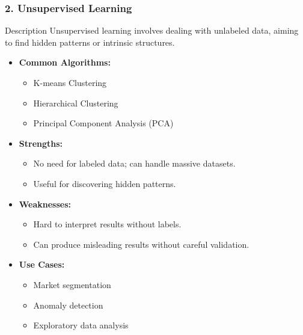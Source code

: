 \documentclass[aspectratio=169]{beamer}
\begin{document}
\begin{frame}[fragile]
    \frametitle{2. Unsupervised Learning}
    \begin{block}{Description}
        Unsupervised learning involves dealing with unlabeled data, aiming to find hidden patterns or intrinsic structures.
    \end{block}
    \begin{itemize}
        \item \textbf{Common Algorithms:}
            \begin{itemize}
                \item K-means Clustering
                \item Hierarchical Clustering
                \item Principal Component Analysis (PCA)
            \end{itemize}
        \item \textbf{Strengths:}
            \begin{itemize}
                \item No need for labeled data; can handle massive datasets.
                \item Useful for discovering hidden patterns.
            \end{itemize}
        \item \textbf{Weaknesses:}
            \begin{itemize}
                \item Hard to interpret results without labels.
                \item Can produce misleading results without careful validation.
            \end{itemize}
        \item \textbf{Use Cases:}
            \begin{itemize}
                \item Market segmentation
                \item Anomaly detection
                \item Exploratory data analysis
            \end{itemize}
    \end{itemize}
\end{frame}
\end{document}

